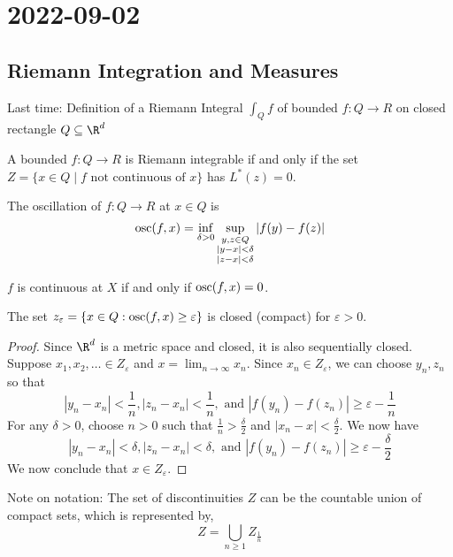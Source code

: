 \section{2022-09-02}

\subsection{Riemann Integration and Measures}
Last time: Definition of a Riemann Integral $\int_Q f$ of bounded $f : Q \to R$ on closed rectangle $Q
\subseteq \R^d$

\begin{theorem}
  A bounded $f : Q \to R$ is Riemann integrable if and only if the set $Z = \{ x \in Q \mid f
  \text{ not continuous of } x \}$ has $L^* (z) = 0$.
\end{theorem}

\begin{definition}[oscillation]
  The oscillation of $f : Q \to R$ at $x \in Q$ is
\[\operatorname*{osc}(f,x) = \inf_{\delta > 0} \sup_{\substack{y, z \in Q \\ | y - x | < \delta \\ |z - x| < \delta}} |f(y) - f(z)| \]
\end{definition}

\begin{lemma}
  $f$ is continuous at $X$ if and only if $\operatorname*{osc} (f,x) = 0$.
\end{lemma}

\begin{lemma}
  The set $z_\varepsilon = \{ x \in Q : \operatorname*{osc}(f,x) \geq \varepsilon \}$ is closed (compact) for $\varepsilon > 0$.
\end{lemma}

\begin{proof}
  Since $\R^d$ is a metric space and closed, it is also sequentially closed.
  Suppose $x_1, x_2, \ldots \in Z_\varepsilon$ and $x = \lim_{n \to \infty} x_n$.
  Since $x_n \in Z_\varepsilon$, we can choose $y_n, z_n$ so that
  \[|y_n - x_n| < \frac{1}{n}, |z_n - x_n| < \frac{1}{n}, \text{ and } |f(y_n) - f(z_n)| \geq \varepsilon - \frac{1}{n}\]
  For any $\delta > 0$, choose $n > 0$ such that $\frac{1}{n} > \frac{\delta}{2}$ and $|x_n - x| < \frac{\delta}{2}$.
  We now have
  \[|y_n - x_n| < \delta, |z_n - x_n| < \delta, \text{ and } |f(y_n) - f(z_n)| \geq \varepsilon - \frac{\delta}{2}\]
  We now conclude that $x \in Z_\varepsilon$.
\end{proof}

Note on notation: The set of discontinuities $Z$ can be the countable union of compact sets, which is represented by,
\[ Z = \bigcup_{n \geq 1} Z_{\frac{1}{n}} \]


